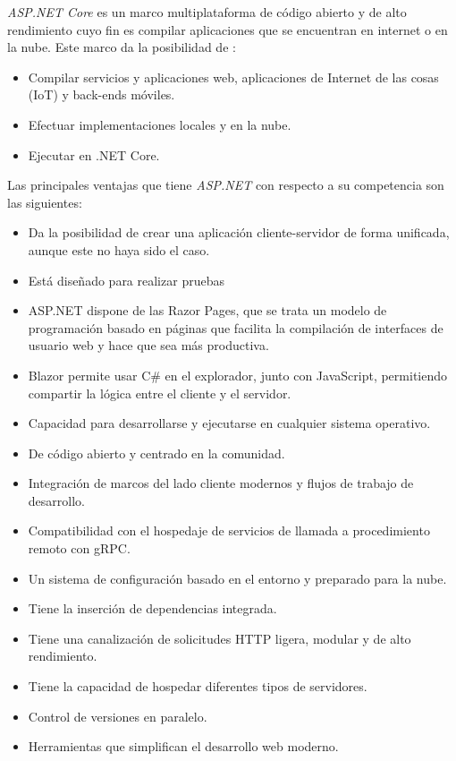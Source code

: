 \cite{ASP.NET}
\textit{ASP.NET Core} es un marco multiplataforma de
    código abierto y de alto rendimiento cuyo fin es compilar aplicaciones que
    se encuentran en internet o en la nube. Este marco da la posibilidad de :
    \begin{itemize}
        \item Compilar servicios y aplicaciones web, aplicaciones de Internet de las cosas (IoT) y back-ends móviles.
        \item Efectuar implementaciones locales y en la nube.
        \item Ejecutar en .NET Core.
    \end{itemize}

    Las principales ventajas que tiene \textit{ASP.NET} con respecto a su competencia son las siguientes:
    \begin{itemize}
        \item Da la posibilidad de crear una aplicación cliente-servidor de forma unificada, aunque este no haya sido el caso.
        \item Está diseñado para realizar pruebas
        \item ASP.NET dispone de las Razor Pages, que se trata un modelo de programación
        basado en páginas que facilita la compilación de interfaces de usuario
        web y hace que sea más productiva.
        \item Blazor permite usar C\# en el explorador, junto con JavaScript, permitiendo compartir la lógica entre el cliente y el servidor.
        \item Capacidad para desarrollarse y ejecutarse en cualquier sistema operativo.
        \item De código abierto y centrado en la comunidad.
        \item Integración de marcos del lado cliente modernos y flujos de trabajo de desarrollo.
        \item Compatibilidad con el hospedaje de servicios de llamada a procedimiento remoto con gRPC.
        \item Un sistema de configuración basado en el entorno y preparado para la nube.
        \item Tiene la inserción de dependencias integrada.
        \item Tiene una canalización de solicitudes HTTP ligera, modular y de alto rendimiento.
        \item Tiene la capacidad de hospedar diferentes tipos de servidores.
        \item Control de versiones en paralelo.
        \item Herramientas que simplifican el desarrollo web moderno.
    \end{itemize}

